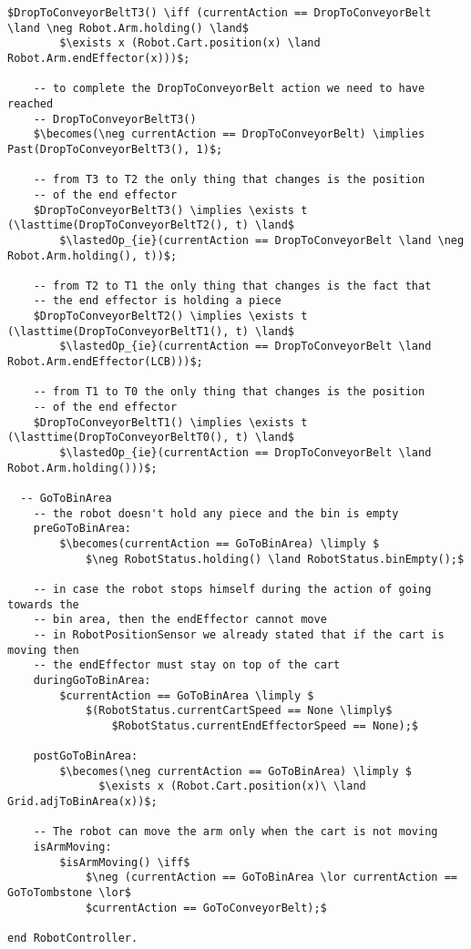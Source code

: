 \begin{lstlisting}[fontadjust, mathescape, frame=single]
    $DropToConveyorBeltT3() \iff (currentAction == DropToConveyorBelt \land \neg Robot.Arm.holding() \land$
        $\exists x (Robot.Cart.position(x) \land Robot.Arm.endEffector(x)))$;
    
    -- to complete the DropToConveyorBelt action we need to have reached
    -- DropToConveyorBeltT3()
    $\becomes(\neg currentAction == DropToConveyorBelt) \implies Past(DropToConveyorBeltT3(), 1)$;
    
    -- from T3 to T2 the only thing that changes is the position
    -- of the end effector
    $DropToConveyorBeltT3() \implies \exists t (\lasttime(DropToConveyorBeltT2(), t) \land$
        $\lastedOp_{ie}(currentAction == DropToConveyorBelt \land \neg Robot.Arm.holding(), t))$;

    -- from T2 to T1 the only thing that changes is the fact that
    -- the end effector is holding a piece
    $DropToConveyorBeltT2() \implies \exists t (\lasttime(DropToConveyorBeltT1(), t) \land$
        $\lastedOp_{ie}(currentAction == DropToConveyorBelt \land Robot.Arm.endEffector(LCB)))$;
    
    -- from T1 to T0 the only thing that changes is the position
    -- of the end effector
    $DropToConveyorBeltT1() \implies \exists t (\lasttime(DropToConveyorBeltT0(), t) \land$
        $\lastedOp_{ie}(currentAction == DropToConveyorBelt \land Robot.Arm.holding()))$;

  -- GoToBinArea
    -- the robot doesn't hold any piece and the bin is empty
    preGoToBinArea:
        $\becomes(currentAction == GoToBinArea) \limply $
            $\neg RobotStatus.holding() \land RobotStatus.binEmpty();$
    
    -- in case the robot stops himself during the action of going towards the 
    -- bin area, then the endEffector cannot move
    -- in RobotPositionSensor we already stated that if the cart is moving then 
    -- the endEffector must stay on top of the cart
    duringGoToBinArea:
        $currentAction == GoToBinArea \limply $
            $(RobotStatus.currentCartSpeed == None \limply$
                $RobotStatus.currentEndEffectorSpeed == None);$

    postGoToBinArea:
        $\becomes(\neg currentAction == GoToBinArea) \limply $
              $\exists x (Robot.Cart.position(x)\ \land Grid.adjToBinArea(x))$;
                      
    -- The robot can move the arm only when the cart is not moving
    isArmMoving: 
        $isArmMoving() \iff$
            $\neg (currentAction == GoToBinArea \lor currentAction == GoToTombstone \lor$
            $currentAction == GoToConveyorBelt);$
         
end RobotController.
\end{lstlisting}

